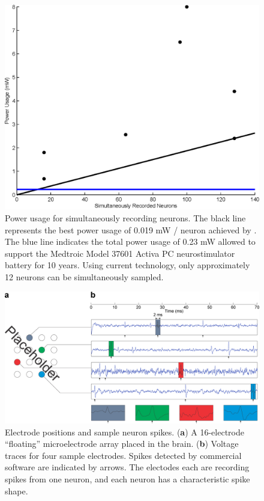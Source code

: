 \documentclass[10 pt]{article}
\begin{document}
\begin{figure}[htbp]
\begin{center}
\includegraphics[scale=0.30]{power.eps}
\caption{Power usage for simultaneously recording neurons. The black line represents the best power usage of 0.019 mW / neuron achieved by \cite{???}. The blue line indicates the total power usage of 0.23 mW allowed to support the Medtroic Model 37601 Activa PC neurostimulator battery for 10 years. Using current technology, only approximately 12 neurons can be simultaneously sampled.}
\label{fig:power}
\end{center}
\end{figure}

\begin{figure}[htbp]
\begin{center}
\includegraphics[scale=0.22]{sample.eps}
\caption{Electrode positions and sample neuron spikes. (\textbf{a}) A 16-electrode ``floating'' microelectrode array placed in the brain. (\textbf{b}) Voltage traces for four sample electrodes. Spikes detected by commercial software \cite{???} are indicated by arrows. The electodes each are recording spikes from one neuron, and each neuron has a characteristic spike shape.} %
\label{fig:sample}
\end{center}
\end{figure}
\end{document}
